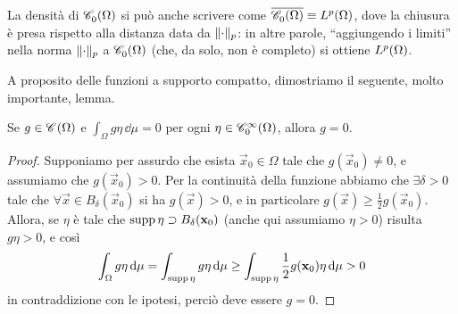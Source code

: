 La densità di $\contsc{\Omega}$ si può anche scrivere come $\clos{\contsc{\Omega}}\equiv\leb[p]{\Omega}$, dove la chiusura è presa rispetto alla distanza data da $\norm{\cdot}_p$: in altre parole, ``aggiungendo i limiti'' nella norma $\norm{\cdot}_p$ a $\contsc{\Omega}$ (che, da solo, non è completo) si ottiene $\leb[p]{\Omega}$.

A proposito delle funzioni a supporto compatto, dimostriamo il seguente, molto importante, lemma.
\begin{lemma} \label{t:fondamentale-calcolo-variazioni}
    Se $g\in\cont{\Omega}$ e $\int_\Omega g\eta\,\dd\mu=0$ per ogni $\eta\in\contsc[\infty]{\Omega}$, allora $g=0$.
\end{lemma}
\begin{proof}
    Supponiamo per assurdo che esista $\vec x_0\in\Omega$ tale che $g(\vec x_0)\ne 0$, e assumiamo che $g(\vec x_0)>0$.
    Per la continuità della funzione abbiamo che $\exists\delta>0$ tale che $\forall\vec x\in B_\delta(\vec x_0)$ si ha $g(\vec x)>0$, e in particolare $g(\vec x)\ge\frac12g(\vec x_0)$.
    Allora, se $\eta$ è tale che $\supp\eta\supset B_\delta(\vec x_0)$ (anche qui assumiamo $\eta>0$) risulta $g\eta>0$, e cos\`i
    \begin{equation}
        \int_\Omega g\eta\,\dd\mu=
        \int_{\supp\eta} g\eta\,\dd\mu\ge
        \int_{\supp\eta} \frac12g(\vec x_0)\eta\,\dd\mu>0
    \end{equation}
    in contraddizione con le ipotesi, perciò deve essere $g=0$.
\end{proof}

